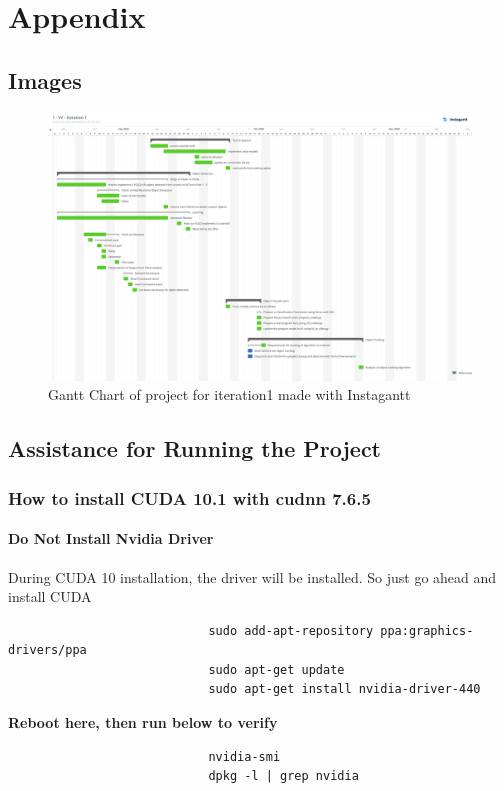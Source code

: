 		\large
			\begingroup
				\let\clearpage\relax
				\chapter*{Appendix}
			\endgroup
        \normalsize
			\section{Images}
			\begin{figure}[h]
				\centering
					\includegraphics[width=1.0\textwidth]{img/gantt_chart.jpeg}
					\caption{Gantt Chart of project for iteration1 made with Instagantt}    
			\end{figure}
			\section{Assistance for Running the Project}
				\subsection*{How to install CUDA 10.1 with cudnn 7.6.5}
					\subsubsection*{Do Not Install Nvidia Driver}
						During CUDA 10 installation, the driver will be installed. So just go ahead and install CUDA

						\begin{verbatim}
							sudo add-apt-repository ppa:graphics-drivers/ppa
							sudo apt-get update
							sudo apt-get install nvidia-driver-440
						\end{verbatim}
						\textbf{Reboot here, then run below to verify}
						\begin{verbatim}
							nvidia-smi
							dpkg -l | grep nvidia
						\end{verbatim}
					
